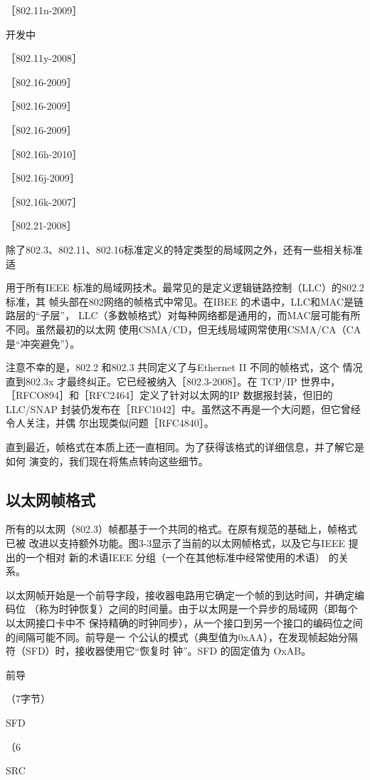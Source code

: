 ［802.11n-2009］

开发中

［802.11y-2008］

［802.16-2009］

［802.16-2009］

［802.16-2009］

［802.16h-2010］

［802.16j-2009］

［802.16k-2007］

［802.21-2008］

除了802.3、802.11、802.16标准定义的特定类型的局域网之外，还有一些相关标准适

用于所有IEEE 标准的局域网技术。最常见的是定义逻辑链路控制（LLC）的802.2标准，其
帧头部在802网络的帧格式中常见。在IBEE 的术语中，LLC和MAC是链路层的“子层”，
LLC（多数帧格式）对每种网络都是通用的，而MAC层可能有所不同。虽然最初的以太网
使用CSMA/CD，但无线局域网常使用CSMA/CA（CA 是“冲突避免”）。

注意不幸的是，802.2 和802.3 共同定义了与Ethernet II 不同的帧格式，这个
情况直到802.3x 才最终纠正。它已经被纳入［802.3-2008］。在 TCP/IP 世界中，
［RFCO894］和［RFC2464］定义了针对以太网的IP 数据报封装，但旧的LLC/SNAP
封装仍发布在［RFC1042］中。虽然这不再是一个大问题，但它曾经令人关注，并偶
尔出现类似问题［RFC4840］。

直到最近，帧格式在本质上还一直相同。为了获得该格式的详细信息，并了解它是如何
演变的，我们现在将焦点转向这些细节。

\subsection{以太网帧格式}

所有的以太网（802.3）帧都基于一个共同的格式。在原有规范的基础上，帧格式已被
改进以支持额外功能。图3-3显示了当前的以太网帧格式，以及它与IEEE 提出的一个相对
新的术语IEEE 分组（一个在其他标准中经常使用的术语） 的关系。

以太网帧开始是一个前导字段，接收器电路用它确定一个帧的到达时间，并确定编码位
（称为时钟恢复）之间的时间量。由于以太网是一个异步的局域网（即每个以太网接口卡中不
保持精确的时钟同步），从一个接口到另一个接口的编码位之间的间隔可能不同。前导是一
个公认的模式（典型值为0xAA），在发现帧起始分隔符（SFD）时，接收器使用它“恢复时
钟”。SFD 的固定值为 OxAB。

前导

（7字节）

SFD

（6

SRC

